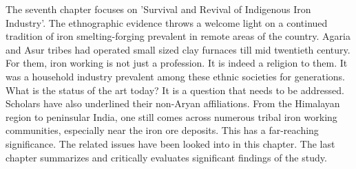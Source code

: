 The seventh chapter focuses on 'Survival and Revival of Indigenous Iron Industry'. The ethnographic evidence throws a welcome light on a continued tradition of iron smelting-forging prevalent in remote areas of the country. Agaria and Asur tribes had operated small sized clay furnaces till mid twentieth century. For them, iron working is not just a profession. It is indeed a religion to them. It was a household industry prevalent among these ethnic societies for generations. What is the status of the art today? It is a question that needs to be addressed. Scholars have also underlined their non-Aryan affiliations. From the Himalayan region to peninsular India, one still comes across numerous tribal iron working communities, especially near the iron ore deposits. This has a far-reaching significance. The related issues have been looked into in this chapter. The last chapter summarizes and critically evaluates significant findings of the study.










